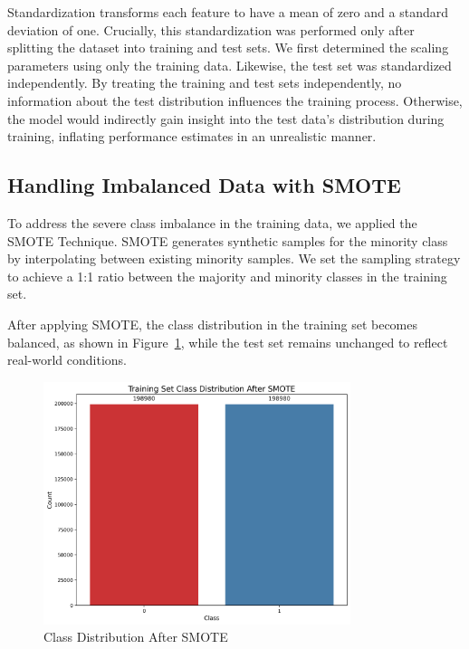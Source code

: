 \documentclass[11pt, oneside]{article}   	%
\begin{document}
Standardization transforms each feature to have a mean of zero and a standard deviation of one. Crucially, this standardization was performed only after splitting the dataset into training and test sets. We first determined the scaling parameters using only the training data. Likewise, the test set was standardized independently. By treating the training and test sets independently, no information about the test distribution influences the training process. Otherwise, the model would indirectly gain insight into the test data’s distribution during training, inflating performance estimates in an unrealistic manner.

\subsection{Handling Imbalanced Data with SMOTE}

To address the severe class imbalance in the training data, we applied the SMOTE Technique. SMOTE generates synthetic samples for the minority class by interpolating between existing minority samples. We set the sampling strategy to achieve a 1:1 ratio between the majority and minority classes in the training set.

After applying SMOTE, the class distribution in the training set becomes balanced, as shown in Figure~\ref{fig:class_distribution_after}, while the test set remains unchanged to reflect real-world conditions.

\begin{figure}[H]
    \centering
    \includegraphics[width=0.8\textwidth]{images/class_distribution_after.png}
    \caption{Class Distribution After SMOTE}
    \label{fig:class_distribution_after}
\end{figure}
\end{document}
